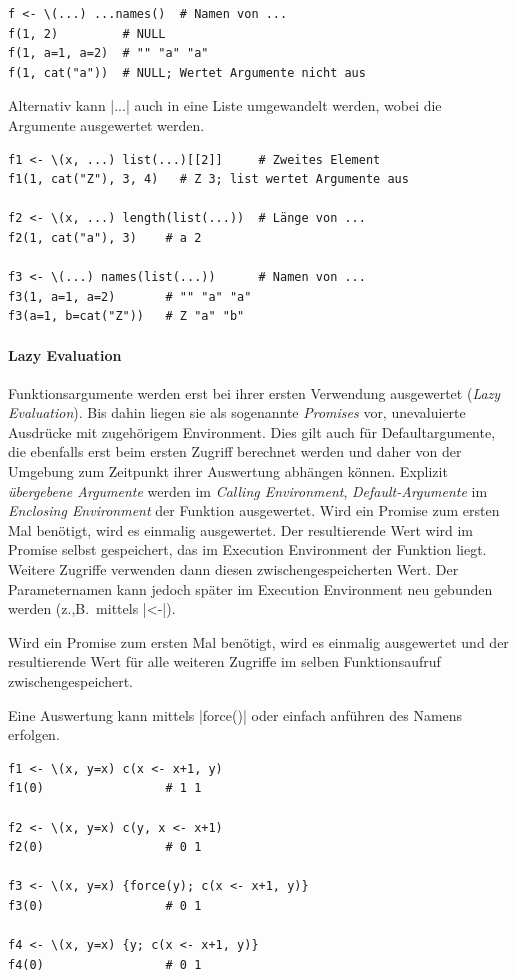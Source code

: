 \documentclass[10pt,twocolumn]{scrartcl}
\renewcommand{\lstinline}{\mycoloredinline}
\begin{document}
\begin{lstlisting}
f <- \(...) ...names()  # Namen von ...
f(1, 2)         # NULL
f(1, a=1, a=2)  # "" "a" "a"
f(1, cat("a"))  # NULL; Wertet Argumente nicht aus
\end{lstlisting}

Alternativ kann \lstinline|...| auch in eine Liste umgewandelt werden, wobei die Argumente ausgewertet werden.

\begin{lstlisting}
f1 <- \(x, ...) list(...)[[2]]     # Zweites Element
f1(1, cat("Z"), 3, 4)   # Z 3; list wertet Argumente aus

f2 <- \(x, ...) length(list(...))  # Länge von ...
f2(1, cat("a"), 3)    # a 2

f3 <- \(...) names(list(...))      # Namen von ...
f3(1, a=1, a=2)       # "" "a" "a"
f3(a=1, b=cat("Z"))   # Z "a" "b"
\end{lstlisting}

\paragraph{Lazy Evaluation}

Funktionsargumente werden erst bei ihrer ersten Verwendung ausgewertet (\emph{Lazy Evaluation}). Bis dahin liegen sie als sogenannte \emph{Promises} vor, unevaluierte Ausdrücke mit zugehörigem Environment. Dies gilt auch für Defaultargumente, die ebenfalls erst beim ersten Zugriff berechnet werden und daher von der Umgebung zum Zeitpunkt ihrer Auswertung abhängen können.
Explizit \emph{übergebene Argumente} werden im \emph{Calling Environment}, \emph{Default-Argumente} im \emph{Enclosing Environment} der Funktion ausgewertet. Wird ein Promise zum ersten Mal benötigt, wird es einmalig ausgewertet. Der resultierende Wert wird im Promise selbst gespeichert, das im Execution Environment der Funktion liegt. Weitere Zugriffe verwenden dann diesen zwischengespeicherten Wert. Der Parameternamen kann jedoch später im Execution Environment neu gebunden werden (z.,B.\ mittels \lstinline|<-|).

Wird ein Promise zum ersten Mal benötigt, wird es einmalig ausgewertet und der resultierende Wert für alle weiteren Zugriffe im selben Funktionsaufruf zwischengespeichert.

Eine Auswertung kann mittels \lstinline|force()| oder einfach anführen des Namens erfolgen.

\begin{lstlisting}
f1 <- \(x, y=x) c(x <- x+1, y)
f1(0)                 # 1 1

f2 <- \(x, y=x) c(y, x <- x+1)
f2(0)                 # 0 1

f3 <- \(x, y=x) {force(y); c(x <- x+1, y)}
f3(0)                 # 0 1

f4 <- \(x, y=x) {y; c(x <- x+1, y)}
f4(0)                 # 0 1
\end{lstlisting}
\end{document}
